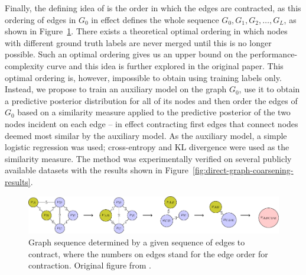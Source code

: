 Finally, the defining idea of \cite{prochazka_scalable_2022} is the order in which the edges are contracted, as this ordering of edges in \( G_0 \) in effect defines the whole sequence \( G_0, G_1, G_2, \dots, G_L \), as shown in Figure~\ref{fig:edge-contraction-sequence}. There exists a theoretical optimal ordering in which nodes with different ground truth labels are never merged until this is no longer possible. Such an optimal ordering gives us an upper bound on the performance-complexity curve and this idea is further explored in the original paper. This optimal ordering is, however, impossible to obtain using training labels only. Instead, we propose to train an auxiliary model on the graph \( G_0 \), use it to obtain a predictive posterior distribution for all of its nodes and then order the edges of \( G_0 \) based on a similarity measure applied to the predictive posterior of the two nodes incident on each edge -- in effect contracting first edges that connect nodes deemed most similar by the auxiliary model. As the auxiliary model, a simple logistic regression was used; cross-entropy and KL divergence were used as the similarity measure. The method was experimentally verified on several publicly available datasets with the results shown in Figure~\ref{fig:direct-graph-coarsening-results}.

\begin{figure}
	\includegraphics[width=\linewidth]{images/edge-contraction-sequence/edge-contraction-sequence.pdf}
	\caption{Graph sequence determined by a given sequence of edges to contract, where the numbers on edges stand for the edge order for contraction. Original figure from \cite{prochazka_scalable_2022}.}
	\label{fig:edge-contraction-sequence}
\end{figure}

